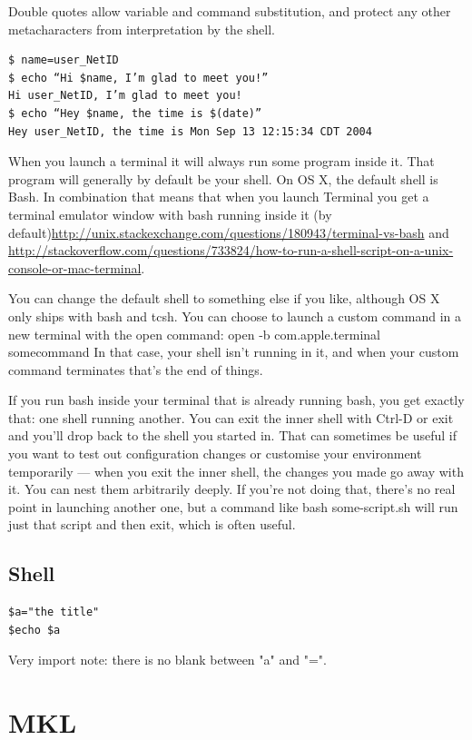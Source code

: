 Double quotes allow variable and command substitution, and protect any other metacharacters from interpretation by the shell.

\begin{verbatim}
$ name=user_NetID
$ echo “Hi $name, I’m glad to meet you!”
Hi user_NetID, I’m glad to meet you!
$ echo “Hey $name, the time is $(date)”
Hey user_NetID, the time is Mon Sep 13 12:15:34 CDT 2004

\end{verbatim}


When you launch a terminal it will always run some program inside it. That program will generally by default be your shell. On OS X, the default shell is Bash. In combination that means that when you launch Terminal you get a terminal emulator window with bash running inside it (by default)\url{http://unix.stackexchange.com/questions/180943/terminal-vs-bash} and \url{http://stackoverflow.com/questions/733824/how-to-run-a-shell-script-on-a-unix-console-or-mac-terminal}.

You can change the default shell to something else if you like, although OS X only ships with bash and tcsh. You can choose to launch a custom command in a new terminal with the open command:
open -b com.apple.terminal somecommand
In that case, your shell isn't running in it, and when your custom command terminates that's the end of things.

If you run bash inside your terminal that is already running bash, you get exactly that: one shell running another. You can exit the inner shell with Ctrl-D or exit and you'll drop back to the shell you started in. That can sometimes be useful if you want to test out configuration changes or customise your environment temporarily — when you exit the inner shell, the changes you made go away with it. You can nest them arbitrarily deeply. If you're not doing that, there's no real point in launching another one, but a command like bash some-script.sh will run just that script and then exit, which is often useful.

\section{Shell}

\begin{verbatim}
$a="the title"
$echo $a
\end{verbatim}
Very import note: there is no blank between "a" and "=".


\chapter{MKL}

